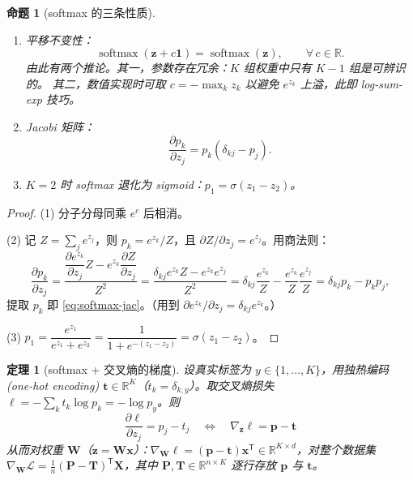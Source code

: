 \documentclass[UTF8,a4paper,11pt]{ctexart}
\theoremstyle{definition}
\theoremstyle{plain}
\newtheorem{theorem}[definition]{定理}
\newtheorem{proposition}[definition]{命题}
\theoremstyle{remark}
\DeclareMathOperator{\softmax}{softmax}
\newcommand{\R}{\mathbb{R}}
\newcommand{\Loss}{\mathcal{L}}
\newcommand{\T}{^{\mathsf{T}}}
\newcommand{\eng}[1]{\textup{(#1)}}
\begin{document}
\begin{proposition}[softmax 的三条性质]\label{prop:softmax}
\begin{enumerate}[label=(\arabic*)]
  \item 平移不变性：
  \[
    \softmax(\bm{z}+c\bm{1})=\softmax(\bm{z}),\qquad\forall\,c\in\R .
  \]
  由此有两个推论。其一，参数存在冗余：$K$ 组权重中只有 $K-1$ 组是可辨识的。
  其二，数值实现时可取 $c=-\max_k z_k$ 以避免 $e^{z_k}$ 上溢，此即 log-sum-exp 技巧。
  \item Jacobi 矩阵：
  \begin{equation}\label{eq:softmax-jac}
    \frac{\partial p_k}{\partial z_j}=p_k(\delta_{kj}-p_j).
  \end{equation}
  \item $K=2$ 时 softmax 退化为 sigmoid：$p_1=\sigma(z_1-z_2)$。
\end{enumerate}
\end{proposition}

\begin{proof}
(1) 分子分母同乘 $e^{c}$ 后相消。

(2) 记 $Z=\sum_je^{z_j}$，则 $p_k=e^{z_k}/Z$，且 $\partial Z/\partial z_j=e^{z_j}$。用商法则：
\[
  \frac{\partial p_k}{\partial z_j}
  =\frac{\dfrac{\partial e^{z_k}}{\partial z_j}Z-e^{z_k}\dfrac{\partial Z}{\partial z_j}}{Z^2}
  =\frac{\delta_{kj}e^{z_k}Z-e^{z_k}e^{z_j}}{Z^2}
  =\delta_{kj}\frac{e^{z_k}}{Z}-\frac{e^{z_k}}{Z}\frac{e^{z_j}}{Z}
  =\delta_{kj}p_k-p_kp_j ,
\]
提取 $p_k$ 即 \eqref{eq:softmax-jac}。（用到 $\partial e^{z_k}/\partial z_j=\delta_{kj}e^{z_k}$。）

(3) $p_1=\dfrac{e^{z_1}}{e^{z_1}+e^{z_2}}=\dfrac{1}{1+e^{-(z_1-z_2)}}=\sigma(z_1-z_2)$。
\end{proof}

\begin{theorem}[softmax + 交叉熵的梯度]\label{thm:softmax-grad}
设真实标签为 $y\in\{1,\dots,K\}$，用独热编码 \eng{one-hot encoding} $\bm{t}\in\R^K$（$t_k=\delta_{k,y}$）。取交叉熵损失 $\ell=-\sum_kt_k\log p_k=-\log p_y$。则
\begin{equation}\label{eq:softmax-grad}
  \boxed{\ \frac{\partial\ell}{\partial z_j}=p_j-t_j
  \quad\Longleftrightarrow\quad
  \nabla_{\bm{z}}\ell=\bm{p}-\bm{t}\ }
\end{equation}
从而对权重 $\bm{W}$（$\bm{z}=\bm{W}\bm{x}$）：$\nabla_{\bm{W}}\ell=(\bm{p}-\bm{t})\bm{x}\T\in\R^{K\times d}$，对整个数据集
$\nabla_{\bm{W}}\Loss=\frac1n(\bm{P}-\bm{T})\T\bm{X}$，其中 $\bm{P},\bm{T}\in\R^{n\times K}$ 逐行存放 $\bm{p}$ 与 $\bm{t}$。
\end{theorem}
\end{document}
